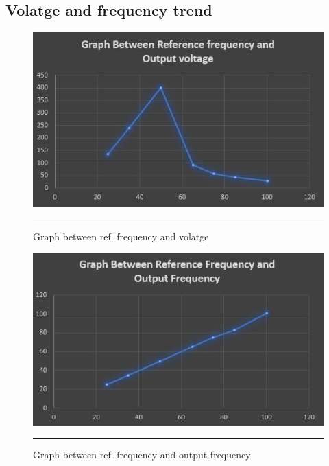 \subsection{Volatge and frequency trend}
\begin{figure}[htbp]
	\centering
	\includegraphics[width = 6in]{./Figures/graph2freq.JPG}
	\rule{35em}{1pt}
	\caption{Graph between ref. frequency and volatge}
\end{figure}
\begin{figure}[htbp]
	\centering
	\includegraphics[width = 6in]{./Figures/graph1freq.JPG}
	\rule{35em}{1pt}
	\caption{Graph between ref. frequency and output frequency}
\end{figure}
